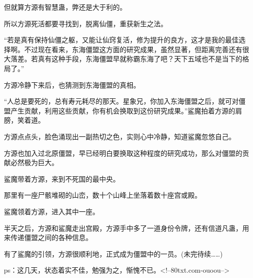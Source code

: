 \begin{this_body}
但就算方源有智慧蛊，弊还是大于利的。

所以方源死活都要寻找到，脱离仙僵，重获新生之法。

“若是真有保持仙僵之躯，又能让仙窍复活，修为提升的良方，这才是我的最佳选择啊。不过现在看来，东海僵盟这方面的研究成果，虽然显著，但距离完善还有很大落差。若真有这种手段，东海僵盟早就称霸东海了吧？天下五域也不是当下的格局了。”

方源冷静下来后，也猜测到东海僵盟的真相。

“人总是要死的，总有寿元耗尽的那天。星象兄，你加入东海僵盟之后，就可对僵盟产生贡献，利用这些贡献，你有机会换取到这份研究成果。”鲨魔拍着方源的肩膀，笑着道。

方源点点头，脸色涌现出一副热切之色，实则心中冷静，知道鲨魔忽悠自己。

方源也加入过北原僵盟，早已经明白要换取这种程度的研究成功，那么对僵盟的贡献必然极为巨大。

鲨魔带着方源，来到不死国的最中央。

那里有一座尸骸堆砌的山峦，数十个山峰上坐落着数十座宫或殿。

鲨魔领着方源，进入其中一座。

半天之后，方源和鲨魔走出宫殿，方源手中多了一道身份令牌，还有信道凡蛊，用来传递僵盟之间的各种信息。

有了鲨魔的引领，方源很顺利地，正式成为僵盟中的一员。(未完待续……)

ps：这几天，状态着实不佳，勉强为之，惭愧不已。<!--80txt.com-ouoou-->

\end{this_body}

